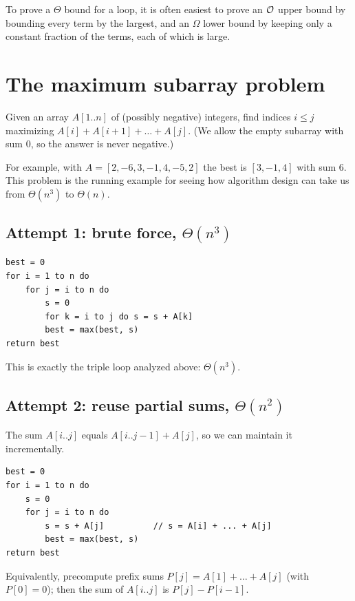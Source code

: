 \begin{aside}
To prove a $\Theta$ bound for a loop, it is often easiest to prove an $\mathcal{O}$ upper bound
by bounding every term by the largest, and an $\Omega$ lower bound by keeping only a
constant fraction of the terms, each of which is large.
\end{aside}

\section{The maximum subarray problem}

\begin{definition}
Given an array $A[1..n]$ of (possibly negative) integers, find indices $i\le j$
maximizing $A[i]+A[i+1]+\dots+A[j]$. (We allow the empty subarray with sum $0$, so the answer is never negative.)
\end{definition}

For example, with $A=[2,-6,3,-1,4,-5,2]$ the best is $[3,-1,4]$ with sum $6$.
This problem is the running example for seeing how algorithm design can take us
from $\Theta(n^3)$ to $\Theta(n)$.

\subsection{Attempt 1: brute force, \texorpdfstring{$\Theta(n^3)$}{Theta(n\textasciicircum 3)}}
\begin{lstlisting}[style=pseudo]
best = 0
for i = 1 to n do
    for j = i to n do
        s = 0
        for k = i to j do s = s + A[k]
        best = max(best, s)
return best
\end{lstlisting}
This is exactly the triple loop analyzed above: $\Theta(n^3)$.

\subsection{Attempt 2: reuse partial sums, \texorpdfstring{$\Theta(n^2)$}{Theta(n\textasciicircum 2)}}
The sum $A[i..j]$ equals $A[i..j-1]+A[j]$, so we can maintain it incrementally.
\begin{lstlisting}[style=pseudo]
best = 0
for i = 1 to n do
    s = 0
    for j = i to n do
        s = s + A[j]          // s = A[i] + ... + A[j]
        best = max(best, s)
return best
\end{lstlisting}
Equivalently, precompute prefix sums $P[j]=A[1]+\dots+A[j]$ (with $P[0]=0$); then
the sum of $A[i..j]$ is $P[j]-P[i-1]$.

